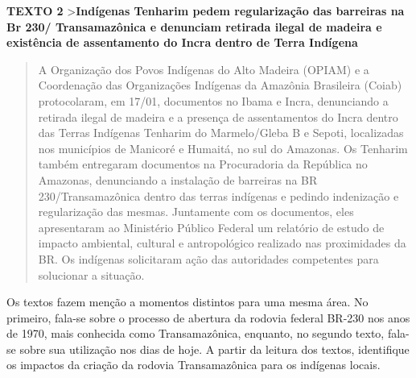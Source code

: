 \textbf{TEXTO 2}
\textgreater{}\textbf{Indígenas Tenharim pedem regularização das barreiras na Br 230/ Transamazônica e denunciam retirada ilegal de madeira e existência de assentamento do Incra dentro de Terra Indígena}

\begin{quote}
A Organização dos Povos Indígenas do Alto Madeira (OPIAM) e a
Coordenação das Organizações Indígenas da Amazônia Brasileira (Coiab)
protocolaram, em 17/01, documentos no Ibama e Incra, denunciando a
retirada ilegal de madeira e a presença de assentamentos do Incra dentro
das Terras Indígenas Tenharim do Marmelo/Gleba B e Sepoti, localizadas
nos municípios de Manicoré e Humaitá, no sul do Amazonas. Os Tenharim
também entregaram documentos na Procuradoria da República no Amazonas,
denunciando a instalação de barreiras na BR 230/Transamazônica dentro
das terras indígenas e pedindo indenização e regularização das mesmas.
Juntamente com os documentos, eles apresentaram ao Ministério Público
Federal um relatório de estudo de impacto ambiental, cultural e
antropológico realizado nas proximidades da BR. Os indígenas solicitaram
ação das autoridades competentes para solucionar a situação.
\end{quote}


Os textos fazem menção a momentos distintos para uma mesma área. No
primeiro, fala-se sobre o processo de abertura da rodovia federal BR-230
nos anos de 1970, mais conhecida como Transamazônica, enquanto, no
segundo texto, fala-se sobre sua utilização nos dias de hoje. A partir
da leitura dos textos, identifique os impactos da criação da rodovia
Transamazônica para os indígenas locais.


